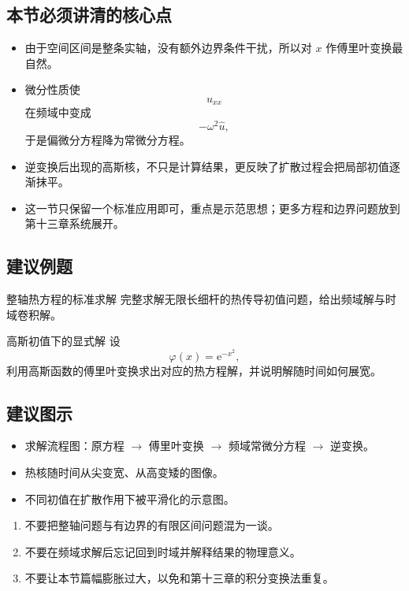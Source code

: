\subsection*{本节必须讲清的核心点}
\begin{itemize}
    \item 由于空间区间是整条实轴，没有额外边界条件干扰，所以对 $x$ 作傅里叶变换最自然。
    \item 微分性质使
    \[
        u_{xx}
    \]
    在频域中变成
    \[
        -\omega^2 \hat{u},
    \]
    于是偏微分方程降为常微分方程。
    \item 逆变换后出现的高斯核，不只是计算结果，更反映了扩散过程会把局部初值逐渐抹平。
    \item 这一节只保留一个标准应用即可，重点是示范思想；更多方程和边界问题放到第十三章系统展开。
\end{itemize}

\subsection*{建议例题}
\begin{lizi}{整轴热方程的标准求解}{}
完整求解无限长细杆的热传导初值问题，给出频域解与时域卷积解。
\end{lizi}

\begin{lizi}{高斯初值下的显式解}{}
设
\[
    \varphi(x)=\mathrm{e}^{-x^2},
\]
利用高斯函数的傅里叶变换求出对应的热方程解，并说明解随时间如何展宽。
\end{lizi}

\subsection*{建议图示}
\begin{itemize}
    \item 求解流程图：原方程 $\to$ 傅里叶变换 $\to$ 频域常微分方程 $\to$ 逆变换。
    \item 热核随时间从尖变宽、从高变矮的图像。
    \item 不同初值在扩散作用下被平滑化的示意图。
\end{itemize}

\begin{jinshi}[本节易错点]
\begin{enumerate}
    \item 不要把整轴问题与有边界的有限区间问题混为一谈。
    \item 不要在频域求解后忘记回到时域并解释结果的物理意义。
    \item 不要让本节篇幅膨胀过大，以免和第十三章的积分变换法重复。
\end{enumerate}
\end{jinshi}

